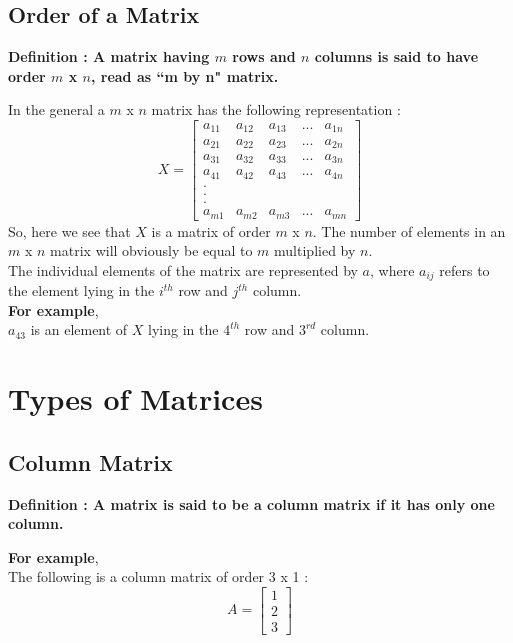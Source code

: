 \documentclass[12pt, letterpaper]{article}
\begin{document}
\subsection{Order of a Matrix}
\begin{displayquote}
\textbf{ Definition : A matrix having $m$ rows and $n$ columns is said to have order $m$ x $n$, read as ``m by n" matrix.}
\end{displayquote}
In the general a $m$ x $n$ matrix has the following representation :
\begin{displaymath}
X = \begin{bmatrix}
a_{11} & a_{12} & a_{13} & ... & a_{1n}\\
a_{21} & a_{22} & a_{23} & ... & a_{2n}\\
a_{31} & a_{32} & a_{33} & ... & a_{3n}\\
a_{41} & a_{42} & a_{43} & ... & a_{4n}\\
.\\
.\\
.\\
a_{m1} & a_{m2} & a_{m3} & ... & a_{mn}
\end{bmatrix}
\end{displaymath}
So, here we see that $X$ is a matrix of order $m$ x $n$. The number of elements in an $m$ x $n$ matrix will obviously be equal to $m$ multiplied by $n$.\\
The individual elements of the matrix are represented by $a$, where $a_{ij}$ refers to the element lying in the $i^{th}$ row and $j^{th}$ column.\\
\textbf{For example}, \\
$a_{43}$ is an element of $X$ lying in the $4^{th}$ row and $3^{rd}$ column.


\section{Types of Matrices}

\subsection{Column Matrix}
\begin{displayquote}
\textbf{Definition : A matrix is said to be a column matrix if it has only one column.}
\end{displayquote}
\textbf{For example},\\
The following is a column matrix of order 3 x 1 : 
\begin{displaymath}
A = \begin{bmatrix}
1 \\
2 \\
3
\end{bmatrix}
\end{displaymath}
\end{document}
